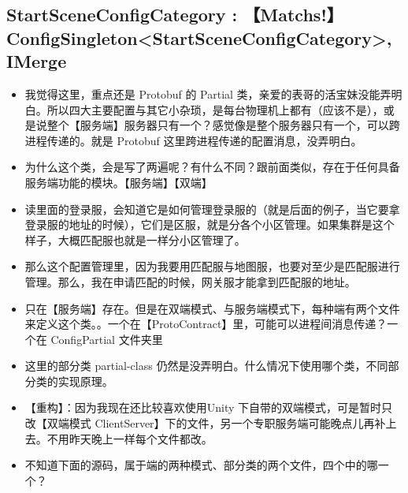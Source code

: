 \documentclass[9pt, b5paper]{article}
\begin{document}
\subsection{StartSceneConfigCategory : 【Matchs!】ConfigSingleton<StartSceneConfigCategory>, IMerge}
\label{sec-2-12}
\begin{itemize}
\item 我觉得这里，重点还是 Protobuf 的 Partial 类，亲爱的表哥的活宝妹没能弄明白。所以四大主要配置与其它小杂琐，是每台物理机上都有（应该不是），或是说整个【服务端】服务器只有一个？感觉像是整个服务器只有一个，可以跨进程传递的。就是 Protobuf 这里跨进程传递的配置消息，没弄明白。
\item 为什么这个类，会是写了两遍呢？有什么不同？跟前面类似，存在于任何具备服务端功能的模块。【服务端】【双端】
\item 读里面的登录服，会知道它是如何管理登录服的（就是后面的例子，当它要拿登录服的地址的时候），它们是区服，就是分各个小区管理。如果集群是这个样子，大概匹配服也就是一样分小区管理了。
\item 那么这个配置管理里，因为我要用匹配服与地图服，也要对至少是匹配服进行管理。那么，我在申请匹配的时候，网关服才能拿到匹配服的地址。
\item 只在【服务端】存在。但是在双端模式、与服务端模式下，每种端有两个文件来定义这个类。。一个在【ProtoContract】里，可能可以进程间消息传递？一个在 ConfigPartial 文件夹里
\item 这里的部分类 partial-class 仍然是没弄明白。什么情况下使用哪个类，不同部分类的实现原理。
\item 【重构】：因为我现在还比较喜欢使用Unity 下自带的双端模式，可是暂时只改【双端模式 ClientServer】下的文件，另一个专职服务端可能晚点儿再补上去。不用昨天晚上一样每个文件都改。
\item 不知道下面的源码，属于端的两种模式、部分类的两个文件，四个中的哪一个？
\end{itemize}
\end{document}
